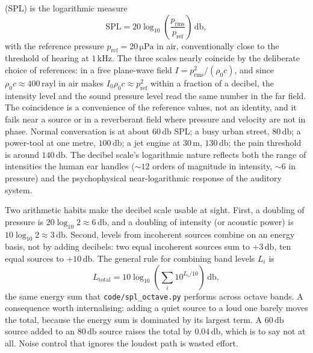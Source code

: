  (SPL) is the logarithmic measure
\[
\text{SPL} = 20\log_{10}\left(\frac{p_{\text{rms}}}{p_{\text{ref}}}
\right)\,\si{\decibel},
\]
with the reference pressure $p_{\text{ref}} = 20\,\si{\micro\pascal}$
in air, conventionally close to the threshold of hearing at $1\,\si{
\kilo\hertz}$. The three scales nearly coincide by the deliberate choice
of references: in a free plane-wave field $I = p_{\text{rms}}^2/(\rho_0
c)$, and since $\rho_0 c \approx 400\,\text{rayl}$ in air makes
$I_0 \rho_0 c \approx p_{\text{ref}}^2$ within a fraction of a decibel,
the intensity level and the sound pressure level read the same number in
the far field. The coincidence is a convenience of the reference values,
not an identity, and it fails near a source or in a reverberant field
where pressure and velocity are not in phase. Normal conversation is at about $60\,\si{\decibel}$
SPL; a busy urban street, $80\,\si{\decibel}$; a power-tool at one
metre, $100\,\si{\decibel}$; a jet engine at $30\,\si{\meter}$,
$130\,\si{\decibel}$; the pain threshold is around $140\,\si{
\decibel}$. The decibel scale's logarithmic nature reflects both the
range of intensities the human ear handles ($\sim 12$ orders of
magnitude in intensity, $\sim 6$ in pressure) and the psychophysical
near-logarithmic response of the auditory system.

Two arithmetic habits make the decibel scale usable at sight. First,
a doubling of pressure is $20\log_{10} 2 \approx 6\,\si{\decibel}$, and
a doubling of intensity (or acoustic power) is $10\log_{10} 2 \approx
3\,\si{\decibel}$. Second, levels from incoherent sources combine on an
energy basis, not by adding decibels: two equal incoherent sources sum
to $+3\,\si{\decibel}$, ten equal sources to $+10\,\si{\decibel}$. The
general rule for combining band levels $L_i$ is
\[
L_{\text{total}} = 10\log_{10}\!\left(\sum_i 10^{L_i/10}\right)\,
\si{\decibel},
\]
the same energy sum that \texttt{code/spl\_octave.py} performs across
octave bands. A consequence worth internalising: adding a quiet source
to a loud one barely moves the total, because the energy sum is
dominated by its largest term. A $60\,\si{\decibel}$ source added to an
$80\,\si{\decibel}$ source raises the total by $0.04\,\si{\decibel}$,
which is to say not at all. Noise control that ignores the loudest path
is wasted effort.

